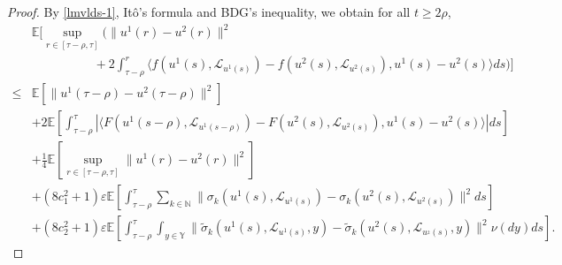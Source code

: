 \documentclass[11pt]{article}
\numberwithin{equation}{section}
\theoremstyle{plain}
\begin{document}
\begin{proof}
 By \eqref{lmvlds-1}, It\^{o}'s formula and BDG's inequality, 
 we obtain for all $t \ge 2\rho$,
 \begin{align}\label{sdsec-8}
 	   & \mathbb{E} 
 	           \bigg[ \sup_{r \in [\tau-\rho, \tau] } 
 	                    \Big( \| u^1(r) - u^2(r) \|^2  \nonumber\\
 	   & \qquad\qquad\quad                  
 	                             + 2 \int_{\tau-\rho}^{r}
 	                                   \langle f(u^1(s), \mathcal{L}_{u^1(s)}) 
 	                                                - f(u^2(s), \mathcal{L}_{u^2(s)}),
 	                                               u^1(s) - u^2(s)
 	                                  \rangle ds
 	                     \Big)
 	             \bigg]  \nonumber\\
\le & \mathbb{E} 
                  \left[ \|  u^1(\tau-\rho) - u^2(\tau-\rho) \|^2 \right]  \nonumber\\
       & + 2 \mathbb{E}
               \left[ \int_{\tau-\rho}^{\tau}
                            \left|
                                 \langle F( u^1(s-\rho),\mathcal{L}_{u^1(s-\rho)})
                                             - F( u^2(s), \mathcal{L}_{u^2(s)}),
                                             u^1(s) - u^2(s)
                                \rangle
                            \right| ds
                \right]  \nonumber\\
       & + \frac{1}{4} \mathbb{E} 
                     \left[ \sup_{r \in [\tau-\rho, \tau] }  \|u^1(r) - u^2(r) \|^2 
                     \right]  \nonumber\\
       & + \left(8 c_1^2 + 1\right) \varepsilon
                \mathbb{E}
                      \left[ \int_{\tau-\rho}^{\tau}
                                   \sum_{k \in \mathbb{N} }
                                               \| \sigma_k(u^1(s),  \mathcal{L}_{u^1(s)}) 
                                                    - \sigma_k(u^2(s),  \mathcal{L}_{u^2(s)})
                                               \|^2 
                                ds
                      \right]   \nonumber\\
       & + \left(8 c_2^2 + 1 \right) \varepsilon 
                  \mathbb{E}
                       \left[ \int_{\tau-\rho}^{\tau}
                                    \int_{ y \in \mathbb{Y} }
                                        \| \widetilde{\sigma}_k(u^{1}(s),  \mathcal{L}_{u^{1}(s)}, y) 
                                           - \widetilde{\sigma}_k(u^{2}(s),  \mathcal{L}_{u^{_2}(s)}, y) \|^2
                                 \nu(dy) ds
                       \right].     	               
 \end{align}
 

\end{proof}
\end{document}
